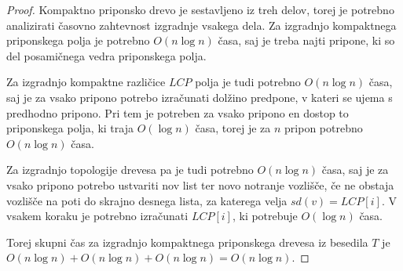 \begin{proof}
    Kompaktno priponsko drevo je sestavljeno iz treh delov, torej je potrebno analizirati časovno zahtevnost izgradnje vsakega dela. Za izgradnjo kompaktnega priponskega polja je potrebno $O(n\log{n})$ časa, saj je treba najti pripone, ki so del posamičnega vedra priponskega polja.
    
    Za izgradnjo kompaktne različice $LCP$ polja je tudi potrebno $O(n\log{n})$ časa, saj je za vsako pripono potrebo izračunati dolžino predpone, v kateri se ujema s predhodno pripono. Pri tem je potreben za vsako pripono en dostop to priponskega polja, ki traja $O(\log{n})$ časa, torej je za $n$ pripon potrebno $O(n\log{n})$ časa.

    Za izgradnjo topologije drevesa pa je tudi potrebno $O(n\log{n})$ časa, saj je za vsako pripono potrebo ustvariti nov list ter novo notranje vozlišče, če ne obstaja vozlišče na poti do skrajno desnega lista, za katerega velja $sd(v)=LCP[i]$. V vsakem koraku je potrebno izračunati $LCP[i]$, ki potrebuje $O(\log{n})$ časa.

    Torej skupni čas za izgradnjo kompaktnega priponskega drevesa iz besedila $T$ je $O(n\log{n})+O(n\log{n})+O(n\log{n})=O(n\log{n})$.
\end{proof}

